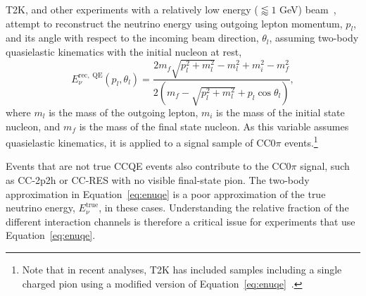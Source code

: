 \documentclass{ar-1col}
\begin{document}
T2K, and other experiments with a relatively low energy ($\lessapprox1$ GeV) beam~\cite{Hyper-Kamiokande:2018ofw, MiniBooNE:2020pnu}, attempt to reconstruct the neutrino energy using outgoing lepton momentum, $p_{l}$, and its angle with respect to the incoming beam direction, $\theta_{l}$, assuming two-body quasielastic kinematics with the initial nucleon at rest,
\begin{equation}
E^{\mathrm{rec,\;QE}}_{\nu}\left(p_{l}, \theta_{l}\right) = \frac{2m_f\sqrt{p_{l}^2 + m^2_l} - m_l^2 + m_i^2-m_f^{2}}{2\left(m_f-\sqrt{p_{l}^2 + m^2_l}+p_l \cos\theta_l\right)},
\label{eq:enuqe}
\end{equation}
\noindent where $m_l$ is the mass of the outgoing lepton, $m_{i}$ is the mass of the initial state nucleon, and $m_{f}$ is the mass of the final state nucleon. As this variable assumes quasielastic kinematics, it is applied to a signal sample of CC0$\pi$ events.\footnote{Note that in recent analyses, T2K has included samples including a single charged pion using a modified version of Equation~\eqref{eq:enuqe}~\cite{T2K:2017rgv, T2K:2019bcf, T2K:2021xwb}.}%
\begin{marginnote}
\end{marginnote}%
Events that are not true CCQE events also contribute to the CC0$\pi$ signal, such as CC-2p2h or CC-RES with no visible final-state pion. The two-body approximation in Equation~\eqref{eq:enuqe} is a poor approximation of the true neutrino energy, $E_{\nu}^{\mathrm{true}}$, in these cases. Understanding the relative fraction of the different interaction channels is therefore a critical issue for experiments that use Equation~\eqref{eq:enuqe}.
\end{document}
